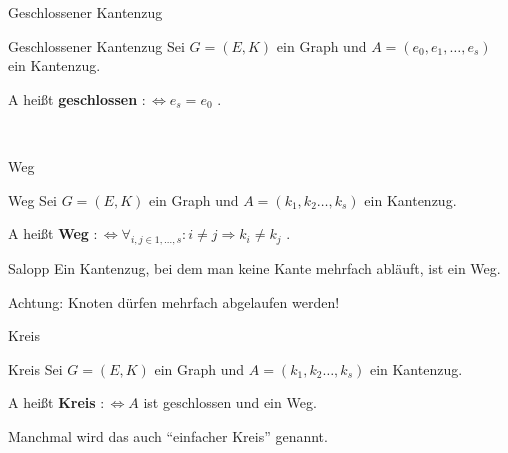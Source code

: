 \begin{frame}{Geschlossener Kantenzug}
\begin{block}{Geschlossener Kantenzug}
Sei $G = (E, K)$ ein Graph und $A = (e_0, e_1, \dots, e_s)$ ein Kantenzug.

A heißt \textbf{geschlossen} $:\Leftrightarrow e_s = e_0$ .
\end{block}

\begin{gallery}
    \\
\end{gallery}
\end{frame}

\begin{frame}{Weg}
\begin{block}{Weg}
Sei $G = (E, K)$ ein Graph und $A = (k_1, k_2 \dots, k_s)$ ein Kantenzug.

A heißt \textbf{Weg} $:\Leftrightarrow \forall_{i, j \in 1, \dots, s}: i \neq j \Rightarrow k_i \neq k_j$ .
\end{block}

\pause

\begin{exampleblock}{Salopp}
Ein Kantenzug, bei dem man keine Kante mehrfach abläuft, ist ein Weg.
\end{exampleblock}

\pause

Achtung: Knoten dürfen mehrfach abgelaufen werden!
\end{frame}

\begin{frame}{Kreis}
\begin{block}{Kreis}
Sei $G = (E, K)$ ein Graph und $A = (k_1, k_2 \dots, k_s)$ ein Kantenzug.

A heißt \textbf{Kreis} $:\Leftrightarrow A$ ist geschlossen und ein Weg.
\end{block}

\pause

Manchmal wird das auch "`einfacher Kreis"' genannt.

\pause

\begin{gallery}
\end{gallery}
\end{frame}

